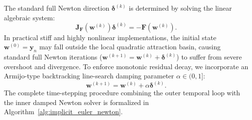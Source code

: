 \documentclass[11pt,a4paper]{article}
\theoremstyle{definition}
\theoremstyle{remark}
\begin{document}
The standard full Newton direction $\boldsymbol{\delta}^{(k)}$ is determined by solving the linear algebraic system:
\begin{equation}
\label{eq:newton_linear_system}
\mathbf{J}_{\mathbf{F}}\left(\mathbf{w}^{(k)}\right) \boldsymbol{\delta}^{(k)} = -\mathbf{F}\left(\mathbf{w}^{(k)}\right).
\end{equation}
In practical stiff and highly nonlinear implementations, the initial state $\mathbf{w}^{(0)} = \mathbf{y}_n$ may fall outside the local quadratic attraction basin, causing standard full Newton iterations ($\mathbf{w}^{(k+1)} = \mathbf{w}^{(k)} + \boldsymbol{\delta}^{(k)}$) to suffer from severe overshoot and divergence. To enforce monotonic residual decay, we incorporate an Armijo-type backtracking line-search damping parameter $\alpha \in (0, 1]$:
\begin{equation}
\label{eq:newton_damped_update}
\mathbf{w}^{(k+1)} = \mathbf{w}^{(k)} + \alpha \boldsymbol{\delta}^{(k)}.
\end{equation}
The complete time-stepping procedure combining the outer temporal loop with the inner damped Newton solver is formalized in Algorithm~\ref{alg:implicit_euler_newton}.
\end{document}
